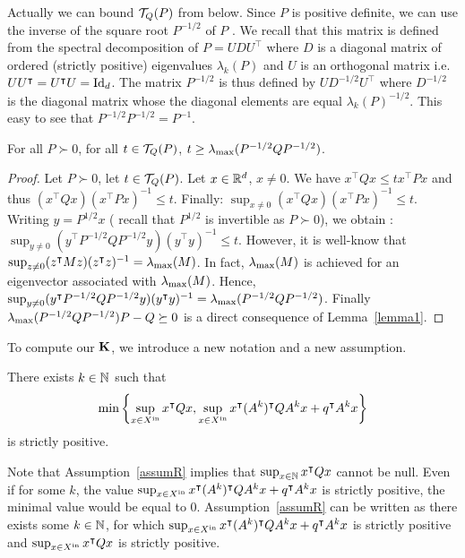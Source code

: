 \documentclass[10pt]{article}
\begin{document}
Actually we can bound $\mathcal{T}_{Q}(P)$ from below. Since $P$ is positive definite, we can use the inverse of the square root $P^{-1/2}$ of $P$ . We recall that this matrix is defined from the spectral decomposition of $P=U D U^\intercal$ where $D$ is a diagonal  matrix of ordered (strictly positive) eigenvalues $\lambda_k(P)$ and $U$ is an orthogonal matrix i.e. $U U^\intercal = U^\intercal U=\operatorname{Id}_d$.   The matrix  $P^{-1/2}$ is thus defined by 
$U D^{-1/2} U^\intercal$ where $D^{-1/2}$ is the diagonal matrix whose the diagonal elements are equal $\lambda_k(P)^{-1/2}$. This easy to see that $P^{-1/2} P^{-1/2}=P^{-1}$. 

\begin{prop}
\label{propcont}
For all $P\succ 0$, for all $t\in\mathcal{T}_{Q}(P)$, $t\geq \lambda_{\operatorname{max}}(P^{-1/2} Q P^{-1/2})$.
\end{prop}
\begin{proof}
Let $P\succ 0$, let $t\in\mathcal{T}_{Q}(P)$. Let $x\in\mathbb R^d$, $x\neq 0$. We have 
$x^\intercal Q x\leq t x^\intercal P x$ and thus $(x^\intercal Q x)(x^\intercal P x)^{-1}\leq t$. Finally:
$\sup_{x\neq 0}(x^\intercal Q x)(x^\intercal P x)^{-1}\leq t $. Writing $y=P^{1/2}x$ ( recall that $P^{1/2}$ is invertible as $P\succ 0$), we obtain :
$\sup_{y\neq 0}(y^\intercal P^{-1/2}Q P^{-1/2}y)(y^\intercal y)^{-1}\leq t $. However, it is well-know that
$\sup_{z\neq 0} (z^\intercal M z)(z^\intercal z)^{-1}=\lambda_{\operatorname{max}}(M)$. In fact, $\lambda_{\operatorname{max}}(M)$ is achieved for an eigenvector associated with $\lambda_{\operatorname{max}}(M)$. Hence, 
$\sup_{y\neq 0} (y^\intercal P^{-1/2}Q P^{-1/2}y)(y^\intercal y)^{-1}=\lambda_{\operatorname{max}}(P^{-1/2} Q P^{-1/2})$. Finally $\lambda_{\operatorname{max}}(P^{-1/2} Q P^{-1/2})P-Q\succeq 0$ is a direct consequence of Lemma~\ref{lemma1}. 

\end{proof}
To compute our $\mathbf{K}$, we introduce a new notation and a new assumption. 
 \begin{assumption}
\label{assumR}
There exists $k\in\mathbb{N}$ such that\[\min\left\{\sup_{x\in X^\mathrm{in}} x^\intercal Q x , \sup_{x\in X^\mathrm{in}} x^\intercal (A^k)^\intercal Q A^k x+q^\intercal A^k x\right\}\] is strictly positive.
\end{assumption}

Note that Assumption~\ref{assumR} implies that $\sup_{x\in\mathbb{N}} x^\intercal Q x$ cannot be null. Even if for some $k$, the value
$\sup_{x\in X^\mathrm{in}} x^\intercal (A^k)^\intercal Q A^k x+q^\intercal A^k x$ is strictly positive, the minimal value would be equal to 0. 
Assumption~\ref{assumR} can be written as there exists  some $k\in\mathbb{N}$, for which $\sup_{x\in X^\mathrm{in}} x^\intercal (A^k)^\intercal Q A^k x+q^\intercal A^k x$ is strictly positive and $\sup_{x\in X^\mathrm{in}} x^\intercal Q x$ is strictly positive.
\end{document}
